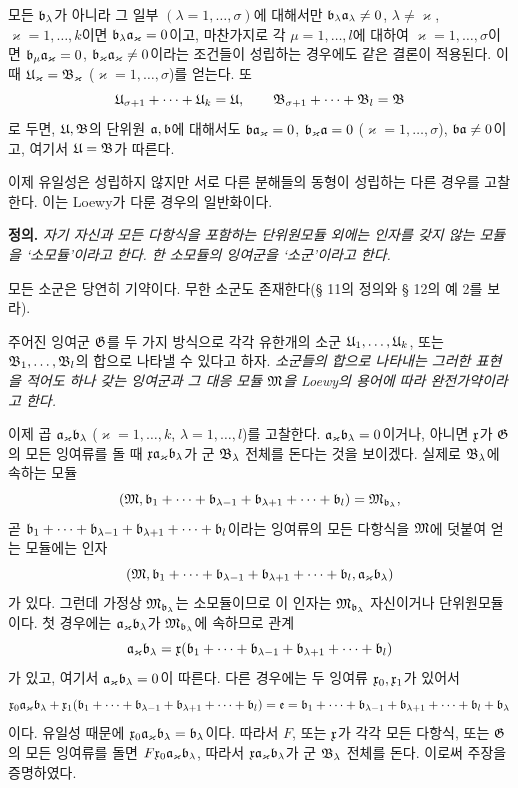모든 \(\mathfrak{b}_\lambda\)가 아니라 그 일부 \((\lambda=1,\ldots,\sigma)\)에 대해서만 \(\mathfrak{b}_\lambda\mathfrak{a}_\lambda\ne0\), \(\lambda\ne\varkappa\), \(\varkappa=1,\ldots,k\)이면 \(\mathfrak{b}_\lambda\mathfrak{a}_\varkappa=0\)이고, 마찬가지로 각 \(\mu=1,\ldots,l\)에 대하여 \(\varkappa=1,\ldots,\sigma\)이면 \(\mathfrak{b}_\mu\mathfrak{a}_\varkappa=0\), \(\mathfrak{b}_\varkappa\mathfrak{a}_\varkappa\ne0\)이라는 조건들이 성립하는 경우에도 같은 결론이 적용된다. 이때 \(\mathfrak U_\varkappa=\mathfrak B_\varkappa\) (\(\varkappa=1,\ldots,\sigma\))를 얻는다. 또
\[
 \mathfrak U_{\sigma+1}+\cdots+\mathfrak U_k=\mathfrak U,\qquad
 \mathfrak B_{\sigma+1}+\cdots+\mathfrak B_l=\mathfrak B
\]
로 두면, \(\mathfrak U,\mathfrak B\)의 단위원 \(\mathfrak{a},\mathfrak{b}\)에 대해서도 \(\mathfrak{b}\mathfrak{a}_\varkappa=0\), \(\mathfrak{b}_\varkappa\mathfrak{a}=0\) (\(\varkappa=1,\ldots,\sigma\)), \(\mathfrak{b}\mathfrak{a}\ne0\)이고, 여기서 \(\mathfrak U=\mathfrak B\)가 따른다.


이제 유일성은 성립하지 않지만 서로 다른 분해들의 동형이 성립하는 다른 경우를 고찰한다. 이는 Loewy가 다룬 경우의 일반화이다.

\textbf{정의.} \emph{자기 자신과 모든 다항식을 포함하는 단위원모듈 외에는 인자를 갖지 않는 모듈을 ‘소모듈’이라고 한다. 한 소모듈의 잉여군을 ‘소군’이라고 한다.}

모든 소군은 당연히 기약이다. 무한 소군도 존재한다(§ 11의 정의와 § 12의 예 2를 보라).

주어진 잉여군 \(\mathfrak G\)를 두 가지 방식으로 각각 유한개의 소군 \(\mathfrak U_1,\ldots,\mathfrak U_k\), 또는 \(\mathfrak B_1,\ldots,\mathfrak B_l\)의 합으로 나타낼 수 있다고 하자. \emph{소군들의 합으로 나타내는 그러한 표현을 적어도 하나 갖는 잉여군과 그 대응 모듈 \(\mathfrak M\)을 Loewy의 용어에 따라 완전가약이라고 한다.}

이제 곱 \(\mathfrak{a}_\varkappa\mathfrak{b}_\lambda\) (\(\varkappa=1,\ldots,k\), \(\lambda=1,\ldots,l\))를 고찰한다. \(\mathfrak{a}_\varkappa\mathfrak{b}_\lambda=0\)이거나, 아니면 \(\mathfrak x\)가 \(\mathfrak G\)의 모든 잉여류를 돌 때 \(\mathfrak x\mathfrak{a}_\varkappa\mathfrak{b}_\lambda\)가 군 \(\mathfrak B_\lambda\) 전체를 돈다는 것을 보이겠다. 실제로 \(\mathfrak B_\lambda\)에 속하는 모듈
\[
 (\mathfrak M,\mathfrak{b}_1+\cdots+\mathfrak{b}_{\lambda-1}
       +\mathfrak{b}_{\lambda+1}+\cdots+\mathfrak{b}_l)=\mathfrak M_{\mathfrak{b}_\lambda},
\]
곧 \(\mathfrak{b}_1+\cdots+\mathfrak{b}_{\lambda-1}+\mathfrak{b}_{\lambda+1}+\cdots+\mathfrak{b}_l\)이라는 잉여류의 모든 다항식을 \(\mathfrak M\)에 덧붙여 얻는 모듈에는 인자
\[
 (\mathfrak M,\mathfrak{b}_1+\cdots+\mathfrak{b}_{\lambda-1}
       +\mathfrak{b}_{\lambda+1}+\cdots+\mathfrak{b}_l,
       \mathfrak{a}_\varkappa\mathfrak{b}_\lambda)
\]
가 있다. 그런데 가정상 \(\mathfrak M_{\mathfrak{b}_\lambda}\)는 소모듈이므로 이 인자는 \(\mathfrak M_{\mathfrak{b}_\lambda}\) 자신이거나 단위원모듈이다. 첫 경우에는 \(\mathfrak{a}_\varkappa\mathfrak{b}_\lambda\)가 \(\mathfrak M_{\mathfrak{b}_\lambda}\)에 속하므로 관계
\[
 \mathfrak{a}_\varkappa\mathfrak{b}_\lambda
 =\mathfrak x(\mathfrak{b}_1+\cdots+\mathfrak{b}_{\lambda-1}
       +\mathfrak{b}_{\lambda+1}+\cdots+\mathfrak{b}_l)
\]
가 있고, 여기서 \(\mathfrak{a}_\varkappa\mathfrak{b}_\lambda=0\)이 따른다. 다른 경우에는 두 잉여류 \(\mathfrak x_0,\mathfrak x_1\)가 있어서
\[
 \mathfrak x_0\mathfrak{a}_\varkappa\mathfrak{b}_\lambda
 +\mathfrak x_1(\mathfrak{b}_1+\cdots+\mathfrak{b}_{\lambda-1}
        +\mathfrak{b}_{\lambda+1}+\cdots+\mathfrak{b}_l)
 =\mathfrak e
 =\mathfrak{b}_1+\cdots+\mathfrak{b}_{\lambda-1}
  +\mathfrak{b}_{\lambda+1}+\cdots+\mathfrak{b}_l+\mathfrak{b}_\lambda
\]
이다. 유일성 때문에 \(\mathfrak x_0\mathfrak{a}_\varkappa\mathfrak{b}_\lambda=\mathfrak{b}_\lambda\)이다. 따라서 \(F\), 또는 \(\mathfrak x\)가 각각 모든 다항식, 또는 \(\mathfrak G\)의 모든 잉여류를 돌면 \(F\mathfrak x_0\mathfrak{a}_\varkappa\mathfrak{b}_\lambda\), 따라서 \(\mathfrak x\mathfrak{a}_\varkappa\mathfrak{b}_\lambda\)가 군 \(\mathfrak B_\lambda\) 전체를 돈다. 이로써 주장을 증명하였다.

